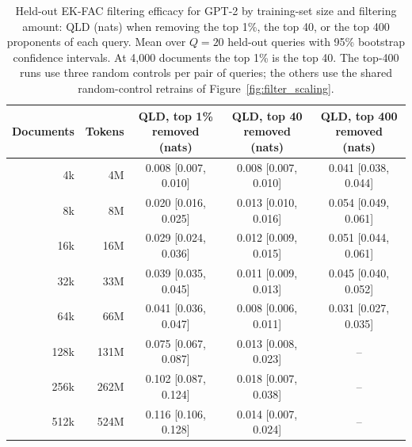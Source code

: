 \begin{table}[t]
\centering
\caption{Held-out EK-FAC filtering efficacy for GPT-2 by training-set size and filtering amount: QLD (nats) when removing the top 1\%, the top 40, or the top 400 proponents of each query. Mean over $Q=20$ held-out queries with 95\% bootstrap confidence intervals. At 4,000 documents the top 1\% is the top 40. The top-400 runs use three random controls per pair of queries; the others use the shared random-control retrains of Figure~\ref{fig:filter_scaling}.}
\label{tab:fixedk}
\small
\begin{tabular}{@{}rrccc@{}}
\toprule
Documents & Tokens & \shortstack{QLD, top 1\% removed\\(nats)} & \shortstack{QLD, top 40 removed\\(nats)} & \shortstack{QLD, top 400 removed\\(nats)} \\
\midrule
4k & 4M & 0.008 [0.007, 0.010] & 0.008 [0.007, 0.010] & 0.041 [0.038, 0.044] \\
8k & 8M & 0.020 [0.016, 0.025] & 0.013 [0.010, 0.016] & 0.054 [0.049, 0.061] \\
16k & 16M & 0.029 [0.024, 0.036] & 0.012 [0.009, 0.015] & 0.051 [0.044, 0.061] \\
32k & 33M & 0.039 [0.035, 0.045] & 0.011 [0.009, 0.013] & 0.045 [0.040, 0.052] \\
64k & 66M & 0.041 [0.036, 0.047] & 0.008 [0.006, 0.011] & 0.031 [0.027, 0.035] \\
128k & 131M & 0.075 [0.067, 0.087] & 0.013 [0.008, 0.023] & -- \\
256k & 262M & 0.102 [0.087, 0.124] & 0.018 [0.007, 0.038] & -- \\
512k & 524M & 0.116 [0.106, 0.128] & 0.014 [0.007, 0.024] & -- \\
\bottomrule
\end{tabular}
\end{table}

